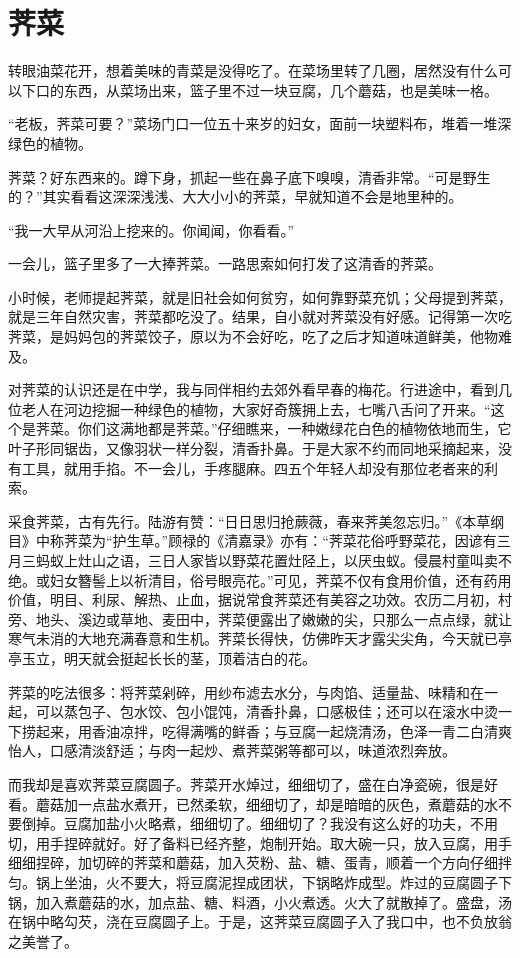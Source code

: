 \chapter[荠菜]{荠\qquad 菜}

转眼油菜花开，想着美味的青菜是没得吃了。在菜场里转了几圈，居然没有什么可以下口的东西，从菜场出来，篮子里不过一块豆腐，几个蘑菇，也是美味一格。

“老板，荠菜可要？”菜场门口一位五十来岁的妇女，面前一块塑料布，堆着一堆深绿色的植物。

荠菜？好东西来的。蹲下身，抓起一些在鼻子底下嗅嗅，清香非常。“可是野生的？”其实看看这深深浅浅、大大小小的荠菜，早就知道不会是地里种的。

“我一大早从河沿上挖来的。你闻闻，你看看。”

一会儿，篮子里多了一大捧荠菜。一路思索如何打发了这清香的荠菜。

\pskip
小时候，老师提起荠菜，就是旧社会如何贫穷，如何靠野菜充饥；父母提到荠菜，就是三年自然灾害，荠菜都吃没了。结果，自小就对荠菜没有好感。记得第一次吃荠菜，是妈妈包的荠菜饺子，原以为不会好吃，吃了之后才知道味道鲜美，他物难及。

对荠菜的认识还是在中学，我与同伴相约去郊外看早春的梅花。行进途中，看到几位老人在河边挖掘一种绿色的植物，大家好奇簇拥上去，七嘴八舌问了开来。“这个是荠菜。你们这满地都是荠菜。”仔细瞧来，一种嫩绿花白色的植物依地而生，它叶子形同锯齿，又像羽状一样分裂，清香扑鼻。于是大家不约而同地采摘起来，没有工具，就用手掐。不一会儿，手疼腿麻。四五个年轻人却没有那位老者来的利索。

\pskip
采食荠菜，古有先行。陆游有赞：“日日思归抢蕨薇，春来荠美忽忘归。”《本草纲目》中称荠菜为“护生草。”顾禄的《清嘉录》亦有：“荠菜花俗呼野菜花，因谚有三月三蚂蚁上灶山之语，三日人家皆以野菜花置灶陉上，以厌虫蚁。侵晨村童叫卖不绝。或妇女簪髻上以祈清目，俗号眼亮花。”可见，荠菜不仅有食用价值，还有药用价值，明目、利尿、解热、止血，据说常食荠菜还有美容之功效。农历二月初，村旁、地头、溪边或草地、麦田中，荠菜便露出了嫩嫩的尖，只那么一点点绿，就让寒气未消的大地充满春意和生机。荠菜长得快，仿佛昨天才露尖尖角，今天就已亭亭玉立，明天就会挺起长长的茎，顶着洁白的花。

\pskip
荠菜的吃法很多：将荠菜剁碎，用纱布滤去水分，与肉馅、适量盐、味精和在一起，可以蒸包子、包水饺、包小馄饨，清香扑鼻，口感极佳；还可以在滚水中烫一下捞起来，用香油凉拌，吃得满嘴的鲜香；与豆腐一起烧清汤，色泽一青二白清爽怡人，口感清淡舒适；与肉一起炒、煮荠菜粥等都可以，味道浓烈奔放。

而我却是喜欢荠菜豆腐圆子。荠菜开水焯过，细细切了，盛在白净瓷碗，很是好看。蘑菇加一点盐水煮开，已然柔软，细细切了，却是暗暗的灰色，煮蘑菇的水不要倒掉。豆腐加盐小火略煮，细细切了。细细切了？我没有这么好的功夫，不用切，用手捏碎就好。好了备料已经齐整，炮制开始。取大碗一只，放入豆腐，用手细细捏碎，加切碎的荠菜和蘑菇，加入芡粉、盐、糖、蛋青，顺着一个方向仔细拌匀。锅上坐油，火不要大，将豆腐泥捏成团状，下锅略炸成型。炸过的豆腐圆子下锅，加入煮蘑菇的水，加点盐、糖、料酒，小火煮透。火大了就散掉了。盛盘，汤在锅中略勾芡，浇在豆腐圆子上。于是，这荠菜豆腐圆子入了我口中，也不负放翁之美誉了。

